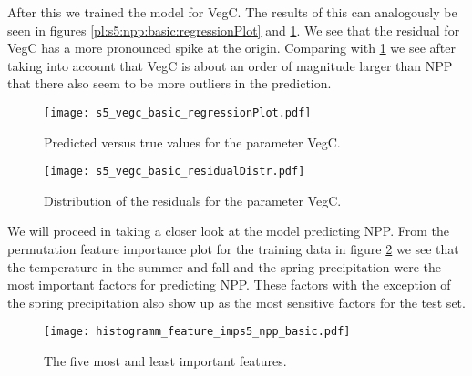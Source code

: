 After this we trained the model for VegC. The results of this can analogously be seen in figures
\ref{pl:s5:npp:basic:regressionPlot} and \ref{pl:s5:npp:basic:residualDistr}. We see that the residual for 
VegC has a more pronounced spike at the origin. Comparing with \ref{pl:s5:npp:basic:residualDistr} we see
 after taking into account that VegC is about
an order of magnitude larger than NPP that there also seem to be more outliers in the prediction.
\begin{figure}[h]
  \centering
  \begin{minipage}{0.45\textwidth}
    \centering
    \texttt{[image: s5\_vegc\_basic\_regressionPlot.pdf]}
    \caption{Predicted versus true values for the parameter VegC.}
    \label{pl:s5:npp:basic:regressionPlot}
  \end{minipage}
  \hfill 
  \begin{minipage}{0.45\textwidth}
    \centering
    \texttt{[image: s5\_vegc\_basic\_residualDistr.pdf]}
    \caption{Distribution of the residuals for the parameter VegC.}
    \label{pl:s5:npp:basic:residualDistr}
  \end{minipage}
\end{figure}

We will proceed in taking a closer look at the model predicting NPP.
From the permutation feature importance plot for the training data in figure \ref{pl:histogramm_feature_imps5_npp_basic}
we see that the temperature in the summer and fall and the spring precipitation were the most important factors for
predicting NPP. These factors with the exception of the spring precipitation also show up as the most sensitive
factors for the test set.
\begin{figure}
  \centering
  \texttt{[image: histogramm\_feature\_imps5\_npp\_basic.pdf]}
  \caption{The five most and least important features.}
  \label{pl:histogramm_feature_imps5_npp_basic}
\end{figure}


